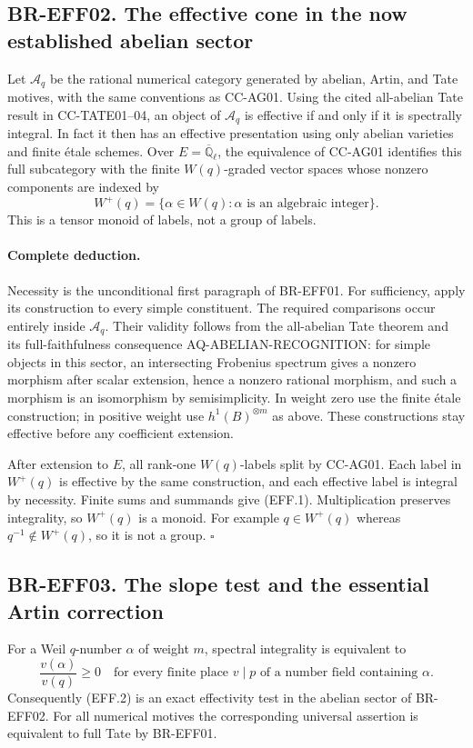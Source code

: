 \documentclass[11pt,a4paper]{article}
\theoremstyle{definition}\newtheorem{definition}[theorem]{Definition}
\theoremstyle{remark}\newtheorem{remark}[theorem]{Remark}
\begin{document}
\subsection{BR-EFF02. The effective cone in the now established abelian sector}
Let $\mathcal A_q$ be the rational numerical category generated by
abelian, Artin, and Tate motives, with the same conventions as
CC-AG01.  Using the cited all-abelian Tate result in CC-TATE01--04,
an object of $\mathcal A_q$ is effective if and only if it is
spectrally integral.  In fact it then has an effective presentation
using only abelian varieties and finite \'etale schemes.  Over
$E=\overline{\mathbb Q}_\ell$, the equivalence of CC-AG01 identifies
this full subcategory with the finite $W(q)$-graded vector spaces
whose nonzero components are indexed by
\[
 W^+(q)=\{\alpha\in W(q):\alpha\text{ is an algebraic integer}\}.
 \tag{EFF.1}
\]
This is a tensor monoid of labels, not a group of labels.

\paragraph{Complete deduction.}
Necessity is the unconditional first paragraph of BR-EFF01.
For sufficiency, apply its construction to every simple constituent.
The required comparisons occur entirely inside $\mathcal A_q$.
Their validity follows from the all-abelian Tate theorem and its
full-faithfulness consequence AQ-ABELIAN-RECOGNITION: for simple
objects in this sector, an intersecting Frobenius spectrum gives a
nonzero morphism after scalar extension, hence a nonzero rational
morphism, and such a morphism is an isomorphism by semisimplicity.
In weight zero use the finite \'etale construction; in positive
weight use $h^1(B)^{\otimes m}$ as above.  These constructions
stay effective before any coefficient extension.

After extension to $E$, all rank-one $W(q)$-labels split by
CC-AG01.  Each label in $W^+(q)$ is effective by the same
construction, and each effective label is integral by necessity.
Finite sums and summands give (EFF.1).  Multiplication preserves
integrality, so $W^+(q)$ is a monoid.  For example $q\in W^+(q)$
whereas $q^{-1}\notin W^+(q)$, so it is not a group.
\(\square\)

\subsection{BR-EFF03. The slope test and the essential Artin correction}
For a Weil $q$-number $\alpha$ of weight $m$, spectral integrality
is equivalent to
\[
 \frac{v(\alpha)}{v(q)}\geq0
 \quad\text{for every finite place }v\mid p
 \text{ of a number field containing }\alpha.
 \tag{EFF.2}
\]
Consequently (EFF.2) is an exact effectivity test in the abelian
sector of BR-EFF02.  For all numerical motives the corresponding
universal assertion is equivalent to full Tate by BR-EFF01.
\end{document}
